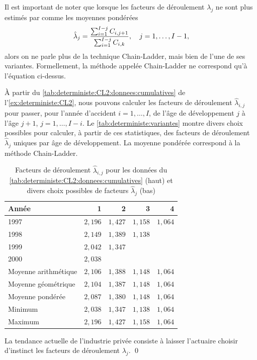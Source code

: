 Il est important de noter que lorsque les facteurs de déroulement
$\lambda_j$ ne sont plus estimés par comme les moyennes pondérées
\begin{equation*}
  \hat{\lambda}_j =
  \frac{\sum_{i = 1}^{I-j} C_{i, j + 1}}{%
    \sum_{i = 1}^{I - j} C_{i,k}}, \quad j = 1, \dots, I - 1,
\end{equation*}
alors on ne parle plus de la technique Chain-Ladder, mais bien de
l'une de ses variantes. Formellement, la méthode appelée Chain-Ladder
ne correspond qu'à l'équation ci-dessus.

\begin{exemple}
  \label{ex:deterministe:variantes}
  À partir du \autoref{tab:deterministe:CL2:donnees:cumulatives} de
  l'\autoref{ex:deterministe:CL2}, nous pouvons calculer les facteurs
  de déroulement $\hat{\lambda}_{i, j}$ pour passer, pour l'année
  d'accident $i = 1, \dots, I$, de l'âge de développement $j$ à l'âge
  $j + 1$, $j = 1, \dots, I - i$. Le
  \autoref{tab:deterministe:variantes} montre divers choix possibles
  pour calculer, à partir de ces statistiques, des facteurs de
  déroulement $\hat{\lambda}_j$ uniques par âge de développement. La
  moyenne pondérée correspond à la méthode Chain-Ladder.

  \begin{table}
    \centering
    \caption{Facteurs de déroulement $\hat{\lambda}_{i, j}$ pour les
      données du \autoref{tab:deterministe:CL2:donnees:cumulatives}
      (haut) et divers choix possibles de facteurs $\hat{\lambda}_j$
      (bas)}
    \label{tab:deterministe:variantes}
    \begin{tabular}{lrrrr}
      \toprule
      Année & 1 & 2 & 3 & 4 \\
      \midrule
      1997 &$2,196$ & $1,427$ & $1,158$ & $1,064$\\
      1998 &$2,149$ & $1,389$ & $1,138$ \\
      1999 &$2,042$ & $1,347$ \\
      2000 &$2,038$ \\
      \midrule
      Moyenne arithmétique & $2,106$ & $1,388$ & $1,148$ & $1,064$ \\
      Moyenne géométrique  & $2,104$ & $1,387$ & $1,148$ & $1,064$ \\
      Moyenne pondérée     & $2,087$ & $1,380$ & $1,148$ & $1,064$ \\
      Minimum              & $2,038$ & $1,347$ & $1,138$ & $1,064$ \\
      Maximum              & $2,196$ & $1,427$ & $1,158$ & $1,064$ \\
      \bottomrule
    \end{tabular}
  \end{table}

  La tendance actuelle de l'industrie privée consiste à laisser
  l'actuaire choisir d'instinct les facteurs de déroulement
  $\lambda_j$. %
  \qed
\end{exemple}


